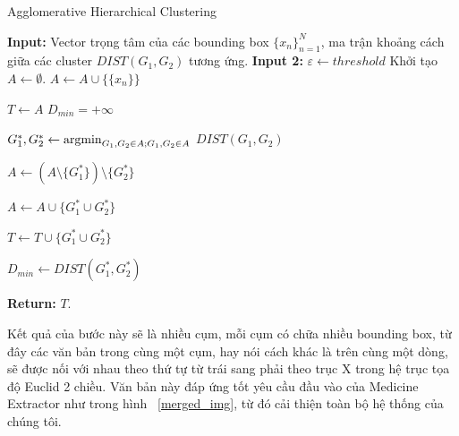 \begin{algorithm}[H]
    \caption{Agglomerative Hierarchical Clustering} \label{alg:AHC}
    \begin{algorithmic}[1]
        \State \textbf{Input: } Vector trọng tâm của các bounding box $\{ x_n \}_{n=1}^{N}$, ma trận khoảng cách giữa các cluster $DIST(G_1, G_2)$ tương ứng.
        \State \textbf{Input 2: } $\varepsilon \gets threshold$ 
        \State Khởi tạo $A \gets \emptyset$.
            \State $A \gets A \cup \{\{x_n\}\}$ 
        \EndFor
        
        \State $T \gets A$ 
        \State $D_{min} = +\infty$ 
        
         
                \State $G_1^{*}, G_2^{*} \gets \operatorname*{argmin}_{G_1, G_2 \in A; G_1, G_2 \in A}$ $DIST(G_1, G_2)$ 
                
                \State $A \gets (A \setminus \{ G_1^* \}) \setminus \{ G_2^* \}$ 
                
                \State $A \gets A \cup \{ G_1^* \cup G_2^* \}$ 
                
                \State $T \gets T \cup \{ G_1^* \cup G_2^* \}$ 
                
                \State $D_{min} \gets DIST(G_1^*, G_2^*)$ 
        \EndWhile
        
        \State \textbf{Return: } $T$. 
        
    \end{algorithmic}
\end{algorithm}

Kết quả của bước này sẽ là nhiều cụm, mỗi cụm có chữa nhiều bounding box, từ đây các văn bản trong cùng một cụm, hay nói cách khác là trên cùng một dòng, sẽ được nối với nhau theo thứ tự từ trái sang phải theo trục X trong hệ trục tọa độ Euclid 2 chiều. Văn bản này đáp ứng tốt yêu cầu đầu vào của Medicine Extractor như trong hình ~\ref{merged_img}, từ đó cải thiện toàn bộ hệ thống  của chúng tôi.

